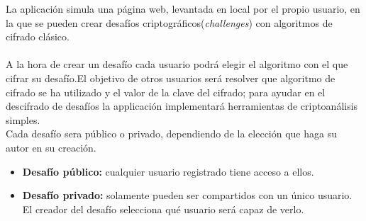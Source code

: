 \documentclass[a4paper,11pt]{article}
\begin{document}
La aplicación simula una página web, levantada en local por el propio usuario,
en la que se pueden crear desafíos criptográficos(\textit{challenges}) con algoritmos de cifrado
clásico.\\\\
A la hora de crear un desafío cada usuario podrá elegir el algoritmo con el que
cifrar su desafío.El objetivo de otros usuarios será resolver que algoritmo de
cifrado se ha utilizado y el valor de la clave del cifrado; para ayudar en el
descifrado de desafíos la applicación implementará herramientas de
criptoanálisis simples.\\
Cada desafío sera público o privado, dependiendo de la elección que haga su
autor en su creación.
\begin{itemize}
    \item \textbf{Desafío público:} cualquier usuario registrado tiene acceso a ellos.
    \item \textbf{Desafío privado:} solamente pueden ser compartidos con un
        único usuario. El creador del desafío selecciona qué usuario será capaz de verlo.
\end{itemize}
\end{document}
